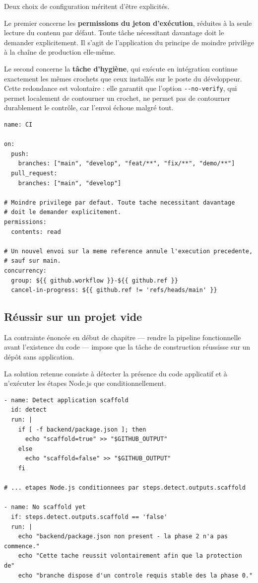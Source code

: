 Deux choix de configuration méritent d'être explicités.

Le premier concerne les \textbf{permissions du jeton d'exécution}, réduites à la
seule lecture du contenu par défaut. Toute tâche nécessitant davantage doit le
demander explicitement. Il s'agit de l'application du principe de moindre
privilège à la chaîne de production elle-même.

Le second concerne la \textbf{tâche d'hygiène}, qui exécute en intégration
continue exactement les mêmes crochets que ceux installés sur le poste du
développeur. Cette redondance est volontaire : elle garantit que l'option
\texttt{-{}-no-verify}, qui permet localement de contourner un crochet, ne
permet pas de contourner durablement le contrôle, car l'envoi échoue malgré
tout.

\begin{lstlisting}[language=yamlperso,caption={Extrait de
\texttt{.github/workflows/ci.yml} --- principe de moindre privilège et
contrôle de concurrence}]
name: CI

on:
  push:
    branches: ["main", "develop", "feat/**", "fix/**", "demo/**"]
  pull_request:
    branches: ["main", "develop"]

# Moindre privilege par defaut. Toute tache necessitant davantage
# doit le demander explicitement.
permissions:
  contents: read

# Un nouvel envoi sur la meme reference annule l'execution precedente,
# sauf sur main.
concurrency:
  group: ${{ github.workflow }}-${{ github.ref }}
  cancel-in-progress: ${{ github.ref != 'refs/heads/main' }}
\end{lstlisting}

\subsection{Réussir sur un projet vide}
\label{sec:ci-projet-vide}

La contrainte énoncée en début de chapitre --- rendre la pipeline fonctionnelle
avant l'existence du code --- impose que la tâche de construction réussisse sur
un dépôt sans application.

La solution retenue consiste à détecter la présence du code applicatif et à
n'exécuter les étapes Node.js que conditionnellement.

\begin{lstlisting}[language=yamlperso,caption={Détection conditionnelle du code
applicatif}]
- name: Detect application scaffold
  id: detect
  run: |
    if [ -f backend/package.json ]; then
      echo "scaffold=true" >> "$GITHUB_OUTPUT"
    else
      echo "scaffold=false" >> "$GITHUB_OUTPUT"
    fi

# ... etapes Node.js conditionnees par steps.detect.outputs.scaffold

- name: No scaffold yet
  if: steps.detect.outputs.scaffold == 'false'
  run: |
    echo "backend/package.json non present - la phase 2 n'a pas commence."
    echo "Cette tache reussit volontairement afin que la protection de"
    echo "branche dispose d'un controle requis stable des la phase 0."
\end{lstlisting}

